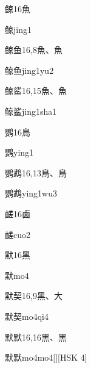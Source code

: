 \begin{Entry}{鲸}{16}{⿂}
  \begin{Phonetics}{鲸}{jing1}
  \end{Phonetics}
\end{Entry}

\begin{Entry}{鲸鱼}{16,8}{⿂、⿂}
  \begin{Phonetics}{鲸鱼}{jing1yu2}
  \end{Phonetics}
\end{Entry}

\begin{Entry}{鲸鲨}{16,15}{⿂、⿂}
  \begin{Phonetics}{鲸鲨}{jing1sha1}
  \end{Phonetics}
\end{Entry}

\begin{Entry}{鹦}{16}{⿃}
  \begin{Phonetics}{鹦}{ying1}
  \end{Phonetics}
\end{Entry}

\begin{Entry}{鹦鹉}{16,13}{⿃、⿃}
  \begin{Phonetics}{鹦鹉}{ying1wu3}
  \end{Phonetics}
\end{Entry}

\begin{Entry}{鹾}{16}{⿄}
  \begin{Phonetics}{鹾}{cuo2}
  \end{Phonetics}
\end{Entry}

\begin{Entry}{默}{16}{⿊}
  \begin{Phonetics}{默}{mo4}
  \end{Phonetics}
\end{Entry}

\begin{Entry}{默契}{16,9}{⿊、⼤}
  \begin{Phonetics}{默契}{mo4qi4}
  \end{Phonetics}
\end{Entry}

\begin{Entry}{默默}{16,16}{⿊、⿊}
  \begin{Phonetics}{默默}{mo4mo4}[][HSK 4]
  \end{Phonetics}
\end{Entry}


